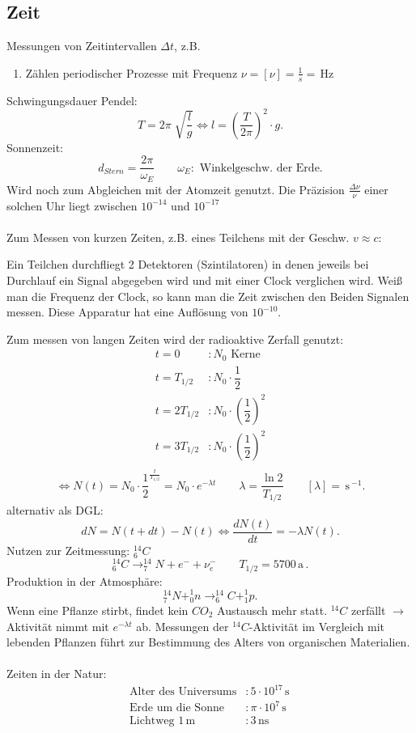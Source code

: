\documentclass[a4paper,12pt]{article}
\numberwithin{equation}{section}
\begin{document}
\subsection{Zeit}
Messungen von Zeitintervallen $\Delta t$, z.B.
\begin{enumerate}[wide,label=$\cdot$]
        \item Zählen periodischer Prozesse mit Frequenz $\nu =[\nu ]=\tfrac{1}{s}=\,\text{Hz}\,$ 
\end{enumerate}
Schwingungsdauer Pendel:
\[ 
T=2\pi \sqrt[]{\dfrac{l}{g}}\Leftrightarrow l=\left( \dfrac{T}{2\pi }\right) ^2\cdot g
.\] 
Sonnenzeit:
\[ 
        d_{Stern}=\dfrac{2\pi }{\omega _E}\qquad \omega _E:\text{ Winkelgeschw. der Erde}
.\] 
Wird noch zum Abgleichen mit der Atomzeit genutzt. Die Präzision $\tfrac{\Delta \nu }{\nu }$  einer solchen Uhr liegt zwischen $10^{-14}$ und $10^{-17}$ \\\\
Zum Messen von kurzen Zeiten, z.B. eines Teilchens mit der Geschw. $v\approx c$:
\begin{center} Ein Teilchen durchfliegt 2 Detektoren (Szintilatoren) in denen jeweils bei Durchlauf ein Signal abgegeben wird und mit einer \glqq Clock\grqq{} verglichen wird. Weiß man die Frequenz der Clock, so kann man die Zeit zwischen den Beiden Signalen messen. Diese Apparatur hat eine Auflösung von $10^{-10}$.\end{center}
Zum messen von langen Zeiten wird der radioaktive Zerfall genutzt:
\begin{align*}
        t=0&:N_0\text{ Kerne}\\
        t=T_{1/2}&:N_0\cdot \dfrac{1}{2}\\
        t=2T_{1/2}&:N_0\cdot \left( \dfrac{1}{2}\right) ^2\\
        t=3T_{1/2}&:N_0\cdot \left( \dfrac{1}{2}\right) ^2\\
\end{align*}
\[ 
        \Leftrightarrow N\left( t\right) =N_0\cdot \dfrac{1}{2}^{\tfrac{t}{T_{1/2} }}=N_0\cdot e^{-\lambda t}\qquad \lambda =\dfrac{\ln 2}{T_{1/2}}\qquad [\lambda ]=\,\text{s}\,^{-1}
.\] 
alternativ als DGL:
\[ 
dN=N\left( t+dt\right) -N\left( t\right) \Leftrightarrow \dfrac{dN\left( t\right) }{dt}=-\lambda N\left( t\right) 
.\]
Nutzen zur Zeitmessung: $^{14}_{6}C$ 
\[ 
^{14}_{6}C\rightarrow ^{14}_{7}N+e^{-}+\nu ^{-}_{e}\qquad T_{1/2}=5700\,\text{a}\,
.\] 
Produktion in der Atmosphäre:
\[ 
^{14}_{7}N+^{1}_{0}n\rightarrow ^{14}_{6}C+^{1}_{1}p
.\] 
Wenn eine Pflanze stirbt, findet kein $CO_{2}$ Austausch mehr statt. $^{14}C$ zerfällt $\rightarrow $ Aktivität nimmt mit $e^{-\lambda t}$ ab. Messungen der $^{14}C$-Aktivität im Vergleich mit lebenden Pflanzen führt zur Bestimmung des Alters von organischen Materialien.\\\\
Zeiten in der Natur:
\begin{align*}
        \text{Alter des Universums}&:5\cdot 10^{17}\,\text{s}\,\\
        \text{Erde um die Sonne}&:\pi \cdot 10^{7}\,\text{s}\,\\
        \text{Lichtweg }1\,\text{m}\,&:3\,\text{ns}\,
\end{align*}
\end{document}
